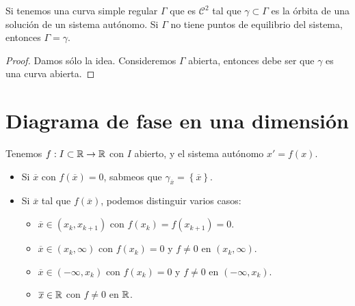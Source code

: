 \begin{prop}
Si tenemos una curva simple regular $\displaystyle \Gamma  $ que es $\displaystyle \mathcal{C}^{2} $ tal que $\displaystyle \gamma\subset \Gamma $ es la órbita de una solución de un sistema autónomo. Si $\displaystyle \Gamma $ no tiene puntos de equilibrio del sistema, entonces $\displaystyle \Gamma = \gamma  $. 
\end{prop}
\begin{proof}
Damos sólo la idea. Consideremos $\displaystyle \Gamma $ abierta, entonces debe ser que $\displaystyle \gamma  $ es una curva abierta. 
\end{proof}
\section{Diagrama de fase en una dimensión}
Tenemos $\displaystyle f : I \subset \mathbb{R} \to \mathbb{R} $ con $\displaystyle I $ abierto, y el sistema autónomo $\displaystyle x' = f\left(x\right) $. 
\begin{itemize}
	\item Si $\displaystyle \overline{x} $ con $\displaystyle f\left(\overline{x}\right)=0 $, sabmeos que $\displaystyle \gamma_{\overline{x}}= \left\{ \overline{x}\right\}  $.
	\item Si $\displaystyle \overline{x} $ tal que $\displaystyle f\left(\overline{x}\right) $, podemos distinguir varios casos:
		\begin{itemize}
		\item $\displaystyle \overline{x}\in \left(x_{k}, x_{k+1}\right) $ con $\displaystyle f\left(x_{k}\right)=f\left(x_{k+1}\right)=0 $. 
		\item $\displaystyle \overline{x}\in \left(x_{k}, \infty \right) $ con $\displaystyle f\left(x_{k}\right)=0 $ y $\displaystyle f\neq 0 $ en $\displaystyle \left(x_{k}, \infty \right) $. 
		\item $\displaystyle \overline{x}\in \left(-\infty, x_{k}\right) $ con $\displaystyle f\left(x_{k}\right)=0 $ y $\displaystyle f \neq 0 $ en $\displaystyle (-\infty, x_{k}) $.
		\item $\displaystyle \overline{x}\in \mathbb{R} $ con $\displaystyle f \neq 0 $ en $\displaystyle \mathbb{R} $. 
		\end{itemize}
\end{itemize}
